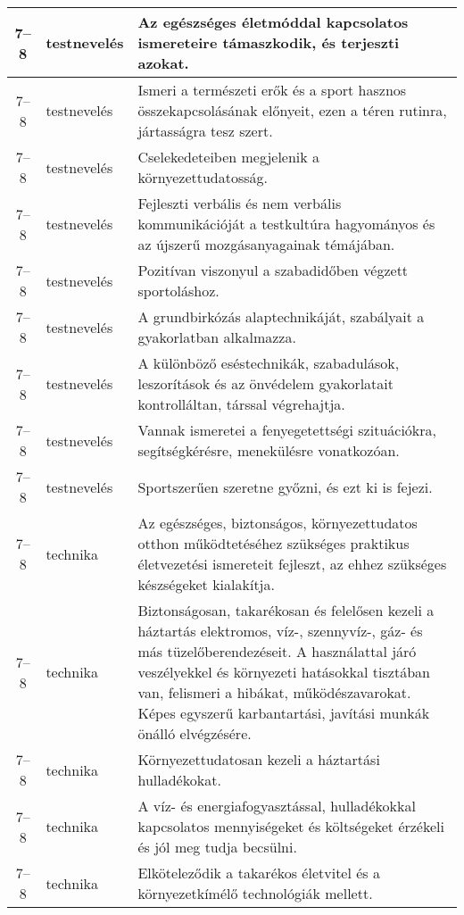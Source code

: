 \begin{small}
\begin{longtable}{c | p{2cm} |  p{11cm} }
              7--8 & testnevelés & Az egészséges életmóddal kapcsolatos ismereteire támaszkodik, és terjeszti azokat. \\ \hline
              7--8 & testnevelés & Ismeri a természeti erők és a sport hasznos összekapcsolásának előnyeit, ezen a téren rutinra, jártasságra tesz szert. \\ \hline
              7--8 & testnevelés & Cselekedeteiben megjelenik a környezettudatosság. \\ \hline
              7--8 & testnevelés & Fejleszti verbális és nem verbális kommunikációját a testkultúra hagyományos és az újszerű mozgásanyagainak témájában. \\ \hline
              7--8 & testnevelés & Pozitívan viszonyul a szabadidőben végzett sportoláshoz. \\ \hline
              7--8 & testnevelés & A grundbirkózás alaptechnikáját, szabályait a gyakorlatban alkalmazza. \\ \hline
              7--8 & testnevelés & A különböző eséstechnikák, szabadulások, leszorítások és az önvédelem gyakorlatait kontrolláltan, társsal végrehajtja. \\ \hline
              7--8 & testnevelés & Vannak ismeretei a fenyegetettségi szituációkra, segítségkérésre, menekülésre vonatkozóan. \\ \hline
              7--8 & testnevelés & Sportszerűen szeretne győzni, és ezt ki is fejezi. \\ \hline
              7--8 & technika & Az egészséges, biztonságos, környezettudatos otthon működtetéséhez szükséges praktikus életvezetési ismereteit fejleszt, az ehhez szükséges készségeket kialakítja. \\ \hline
              7--8 & technika & Biztonságosan, takarékosan és felelősen kezeli a háztartás elektromos, víz-, szennyvíz-, gáz- és más tüzelőberendezéseit. A használattal járó veszélyekkel és környezeti hatásokkal tisztában van, felismeri a hibákat, működészavarokat. Képes egyszerű karbantartási, javítási munkák önálló elvégzésére. \\ \hline
              7--8 & technika & Környezettudatosan kezeli a háztartási hulladékokat. \\ \hline
              7--8 & technika & A víz- és energiafogyasztással, hulladékokkal kapcsolatos mennyiségeket és költségeket érzékeli és jól meg tudja becsülni. \\ \hline
              7--8 & technika & Elköteleződik a takarékos életvitel és a környezetkímélő technológiák mellett. \\ \hline

\end{longtable}
\end{small}
